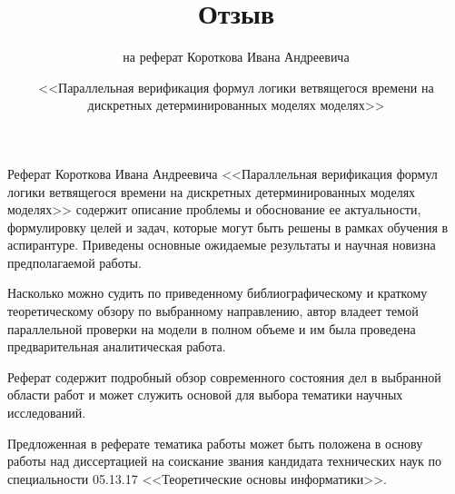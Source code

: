 \documentclass[a4paper,12pt,notitlepage]{article}
\title{Отзыв}
\date{\normalsize{<<Параллельная верификация формул логики ветвящегося времени на
    дискретных детерминированных моделях моделях>>}}
\author{\small{на реферат Короткова Ивана Андреевича}}
\begin{document}
\maketitle

\vspace{1cm}

\thispagestyle{empty}

Реферат Короткова Ивана Андреевича <<Параллельная верификация формул логики ветвящегося
времени на дискретных детерминированных моделях моделях>> содержит описание проблемы и
обоснование ее актуальности, формулировку целей и задач, которые могут быть решены в
рамках обучения в аспирантуре. Приведены основные ожидаемые результаты и научная новизна
предполагаемой работы.

Насколько можно судить по приведенному библиографическому и краткому теоретическому обзору
по выбранному направлению, автор владеет темой параллельной проверки на модели в полном
объеме и им была проведена предварительная аналитическая работа.

Реферат содержит подробный обзор современного состояния дел в выбранной области работ и
может служить основой для выбора тематики научных исследований.

Предложенная в реферате тематика работы может быть положена в основу работы над
диссертацией на соискание звания кандидата технических наук по специальности 05.13.17
<<Теоретические основы информатики>>.

\end{document}
